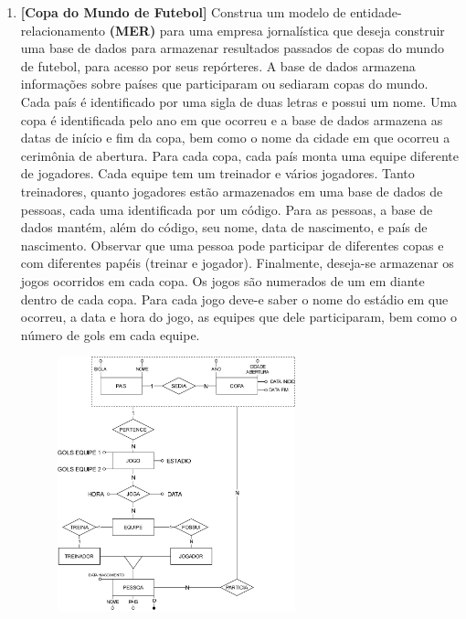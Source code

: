 \documentclass[a4paper, 12pt]{article}
\begin{document}
\begin{enumerate}
		\item \textbf{[Copa do Mundo de Futebol]} Construa um modelo de entidade-relacionamento \textbf{(MER)} para uma empresa jornalística que deseja construir uma base de dados para armazenar resultados passados de copas do mundo de futebol, para acesso por seus repórteres. A base de dados armazena informações sobre países que participaram ou sediaram copas do mundo. Cada país é identificado por uma sigla de duas letras e possui um nome. Uma copa é identificada pelo ano em que ocorreu e a base de dados armazena as datas de início e fim da copa, bem como o nome da cidade em que ocorreu a cerimônia de abertura. Para cada copa, cada país monta uma equipe diferente de jogadores. Cada equipe tem um treinador e vários jogadores. Tanto treinadores, quanto jogadores estão armazenados em uma base de dados de pessoas, cada uma identificada por um código. Para as pessoas, a base de dados mantém, além do código, seu nome, data de nascimento, e país de nascimento. Observar que uma pessoa pode participar de diferentes copas e com diferentes papéis (treinar e jogador). Finalmente, deseja-se armazenar os jogos ocorridos em cada copa. Os jogos são numerados de um em diante dentro de cada copa. Para cada jogo deve-e saber o nome do estádio em que ocorreu, a data e hora do jogo, as equipes que dele participaram, bem como o número de gols em cada equipe.
		
		\begin{figure}[H]
			\centering
			\includegraphics[width=0.65\textwidth]{copaDoMundo.png}
		\end{figure}
		\newpage
		
	\end{enumerate}
		
\end{document}
